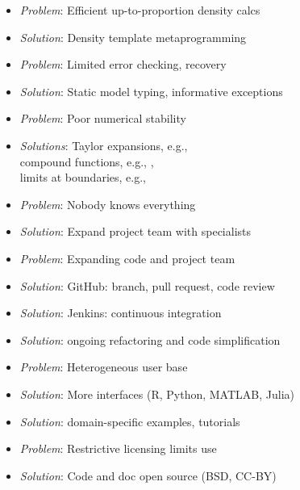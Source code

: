 \documentclass[10pt]{report}
\begin{document}
\begin{itemize}
%
\vspace*{8pt}
\item {\slshape Problem}:  Efficient up-to-proportion density calcs
\item {\slshape Solution}: Density template metaprogramming 
%
\vspace*{8pt}
\item {\slshape Problem}:  Limited error checking, recovery
\item {\slshape Solution}: Static model typing, informative exceptions
%
\vspace*{8pt}
\item {\slshape Problem}:  Poor numerical stability
\item {\slshape Solutions}:
Taylor expansions, e.g., {\small {}}
\\[2pt]
compound functions, e.g., {\small {}, \
}
\\[2pt]
limits at boundaries, e.g., {\small {}}

\end{itemize}

\begin{itemize}
\item {\slshape Problem}:  Nobody knows everything
\item {\slshape Solution}: Expand project team with specialists
\vspace*{8pt}
\item {\slshape Problem}:  Expanding code and project team
\item {\slshape Solution}: GitHub: branch, pull 
  request, code review
\item {\slshape Solution}: Jenkins: continuous integration
\item {\slshape Solution}: ongoing refactoring and code simplification
%
\end{itemize}

\begin{itemize}
\item {\slshape Problem}:  Heterogeneous user base
\item {\slshape Solution}: More interfaces (R, Python, MATLAB, Julia)
\item {\slshape Solution}:  domain-specific examples, tutorials
\vspace*{8pt}
\item {\slshape Problem}:  Restrictive licensing limits use
\item {\slshape Solution}: Code and doc open source
(BSD, CC-BY)
\end{itemize}
\end{document}

